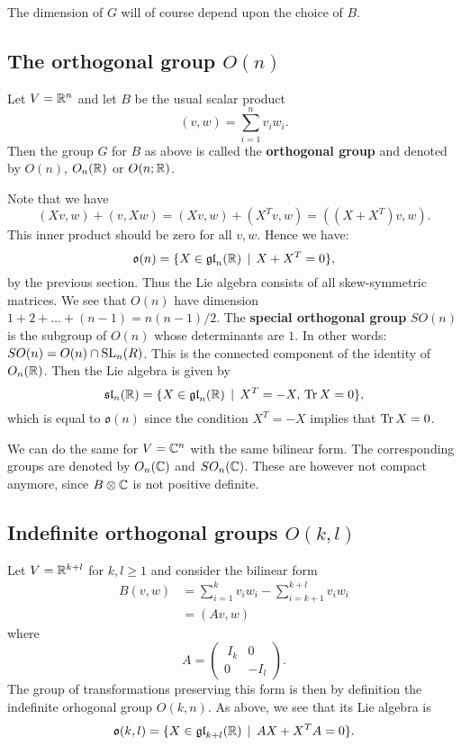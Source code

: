 \documentclass[11pt, english]{article}
\begin{document}
The dimension of $G$ will of course depend upon the choice of $B$.

\subsection{The orthogonal group $O(n)$}

Let $V=\mathbb{R}^n$ and let $B$ be the usual scalar product
$$
(v,w) = \sum_{i=1}^n v_i w_i.
$$
Then the group $G$ for $B$ as above is called the \textbf{orthogonal group} and denoted by $O(n)$, $O_n(\mathbb{R})$ or $O(n; \mathbb{R})$. 

Note that we have
$$
(Xv,w)+(v,Xw) = (Xv,w)+(X^Tv,w)= ((X+X^T)v,w).
$$
This inner product should be zero for all $v,w$. Hence we have:
$$
\mathfrak{o}(n) = \{ X \in \mathfrak{gl}_n(\mathbb{R}) \, \mid \, X+X^T = 0 \},
$$
by the previous section. Thus the Lie algebra consists of all skew-symmetric matrices. We see that $O(n)$ have dimension $1+2+\ldots+(n-1)=n(n-1)/2$. The \textbf{special orthogonal group} $SO(n)$ is the subgroup of $O(n)$ whose determinants are $1$. In other words: $SO(n) = O(n) \cap \operatorname{SL}_n(R)$. This is the connected component of the identity of $O_n(\mathbb{R})$. Then the Lie algebra is given by
$$
\mathfrak{sl}_n(\mathbb{R}) = \{ X \in \mathfrak{gl}_n(\mathbb{R}) \, \mid \, X^T=-X, \, \operatorname{Tr} X = 0 \},
$$
which is equal to $\mathfrak{o}(n)$ since the condition $X^T=-X$ implies that $\operatorname{Tr} X = 0$.

We can do the same for $V= \mathbb{C}^n$ with the same bilinear form. The corresponding groups are denoted by $O_n(\mathbb{C})$ and $SO_n(\mathbb{C})$. These are however not compact anymore, since $B \otimes \mathbb{C}$ is not positive definite.

\subsection{Indefinite orthogonal groups $O(k,l)$}

Let $V=\mathbb{R}^{k+l}$ for $k, l \geq 1$ and consider the bilinear form
\begin{align*}
B(v,w) &= \sum_{i=1}^k v_iw_i - \sum_{i=k+1}^{k+l} v_iw_i \\
&= (Av,w)
\end{align*}
where
$$
A = \begin{pmatrix} \
I_k &  0 \\
0 & -I_l \end{pmatrix}.
$$
The group of transformations preserving this form is then by definition the indefinite orhogonal group $O(k,n)$. As above, we see that its Lie algebra is
$$
\mathfrak{o}(k,l) = \{ X \in \mathfrak{gl}_{k+l}(\mathbb{R}) \, \mid \, AX+X^TA=0 \} . 
$$
\end{document}
